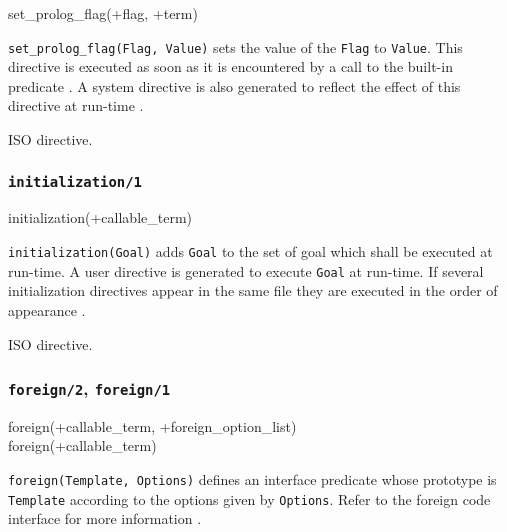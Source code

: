 \begin{TemplatesOneCol}
set\_prolog\_flag(+flag, +term)

\end{TemplatesOneCol}

\Description

\texttt{set\_prolog\_flag(Flag, Value)} sets the value of the
 \texttt{Flag} to \texttt{Value}. This directive is
executed as soon as it is encountered by a call to the built-in predicate
 . A system directive
is also generated to reflect the effect of this directive at run-time
.

\Portability

ISO directive.

\subsubsection{\texttt{initialization/1}}
\label{initialization/1}

\begin{TemplatesOneCol}
initialization(+callable\_term)

\end{TemplatesOneCol}

\Description

\texttt{initialization(Goal)} adds \texttt{Goal} to the set of goal which
shall be executed at run-time. A user directive is generated to execute
\texttt{Goal} at run-time. If several initialization directives appear in
the same file they are executed in the order of appearance
.

\Portability

ISO directive.

\subsubsection{\texttt{foreign/2},
               \texttt{foreign/1}}
\label{foreign/2}

\begin{TemplatesOneCol}
foreign(+callable\_term, +foreign\_option\_list)\\
foreign(+callable\_term)

\end{TemplatesOneCol}

\Description

\texttt{foreign(Template, Options)} defines an interface predicate whose
prototype is \texttt{Template} according to the options given by
\texttt{Options}. Refer to the foreign code interface for more information
.


